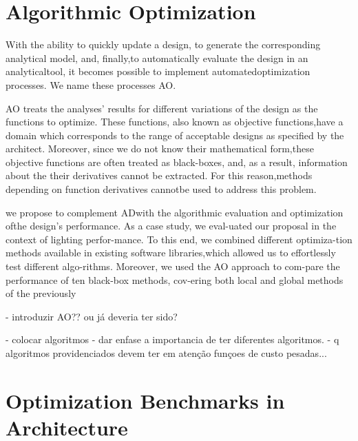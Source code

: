 \cleardoublepage
\label{chap:implement}



\section{Algorithmic Optimization}

With the ability to quickly update a design, to generate the corresponding analytical model, and, finally,to automatically evaluate the design in an analyticaltool, it becomes possible to implement automatedoptimization processes.  We name these processes \ac{AO}.

AO treats the analyses’ results for different variations of the design as the functions to optimize. These functions, also known as objective functions,have a domain which corresponds to the range of acceptable designs as specified by the architect. Moreover, since we do not know their mathematical form,these objective functions are often treated as black-boxes, and, as a result, information about the their derivatives cannot be extracted.  For this reason,methods depending on function derivatives cannotbe used to address this problem.  

we propose to complement ADwith the algorithmic evaluation and optimization ofthe design’s performance. As a case study, we eval-uated our proposal in the context of lighting perfor-mance. To this end, we combined different optimiza-tion methods available in existing software libraries,which allowed us to effortlessly test different algo-rithms. Moreover, we used the AO approach to com-pare the performance of ten black-box methods, cov-ering both local and global methods of the previously


- introduzir AO?? ou já deveria ter sido?

- colocar algoritmos
- dar enfase a importancia de ter diferentes algoritmos.
- q algoritmos providenciados devem ter em atenção funçoes de custo pesadas...


\section{Optimization Benchmarks in Architecture}

